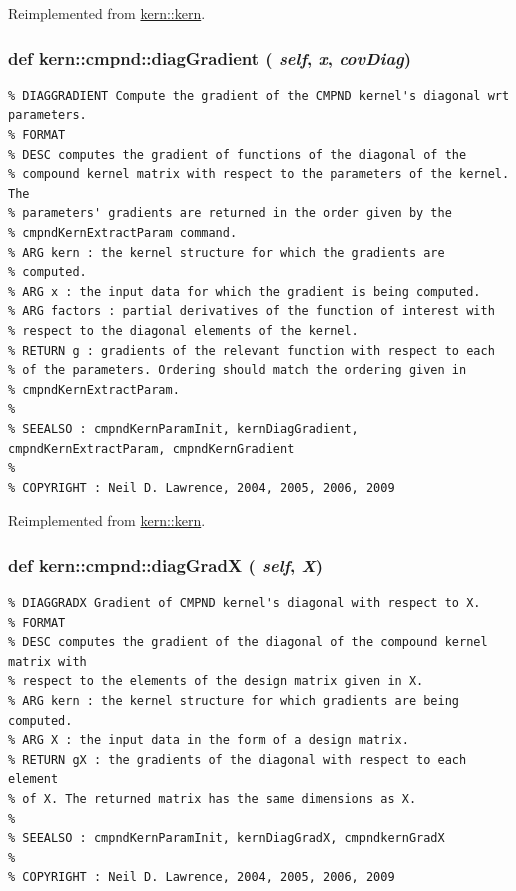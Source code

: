 Reimplemented from \hyperlink{classkern_1_1kern}{kern::kern}.\hypertarget{classkern_1_1cmpnd_9ae8217ccbe28caeaa509ee33123c67a}{
\subsubsection[{diagGradient}]{\setlength{\rightskip}{0pt plus 5cm}def kern::cmpnd::diagGradient ( {\em self}, \/   {\em x}, \/   {\em covDiag})}}
\label{classkern_1_1cmpnd_9ae8217ccbe28caeaa509ee33123c67a}




\footnotesize\begin{verbatim}% DIAGGRADIENT Compute the gradient of the CMPND kernel's diagonal wrt parameters.
% FORMAT
% DESC computes the gradient of functions of the diagonal of the
% compound kernel matrix with respect to the parameters of the kernel. The
% parameters' gradients are returned in the order given by the
% cmpndKernExtractParam command.
% ARG kern : the kernel structure for which the gradients are
% computed.
% ARG x : the input data for which the gradient is being computed.
% ARG factors : partial derivatives of the function of interest with
% respect to the diagonal elements of the kernel.
% RETURN g : gradients of the relevant function with respect to each
% of the parameters. Ordering should match the ordering given in
% cmpndKernExtractParam.
%
% SEEALSO : cmpndKernParamInit, kernDiagGradient, cmpndKernExtractParam, cmpndKernGradient
%
% COPYRIGHT : Neil D. Lawrence, 2004, 2005, 2006, 2009

\end{verbatim}
\normalsize
 

Reimplemented from \hyperlink{classkern_1_1kern}{kern::kern}.\hypertarget{classkern_1_1cmpnd_fa9a662412350b04289be9554bfd2b6e}{
\subsubsection[{diagGradX}]{\setlength{\rightskip}{0pt plus 5cm}def kern::cmpnd::diagGradX ( {\em self}, \/   {\em X})}}
\label{classkern_1_1cmpnd_fa9a662412350b04289be9554bfd2b6e}




\footnotesize\begin{verbatim}% DIAGGRADX Gradient of CMPND kernel's diagonal with respect to X.
% FORMAT
% DESC computes the gradient of the diagonal of the compound kernel matrix with
% respect to the elements of the design matrix given in X.
% ARG kern : the kernel structure for which gradients are being computed.
% ARG X : the input data in the form of a design matrix.
% RETURN gX : the gradients of the diagonal with respect to each element
% of X. The returned matrix has the same dimensions as X.
%
% SEEALSO : cmpndKernParamInit, kernDiagGradX, cmpndkernGradX
%
% COPYRIGHT : Neil D. Lawrence, 2004, 2005, 2006, 2009

\end{verbatim}
\normalsize
 

